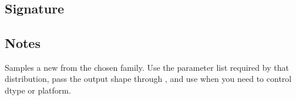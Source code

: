\documentclass[letterpaper,10pt,english]{sphinxmanual}
\begin{document}
\section{}
\label{\detokenize{api_reference:sample}}

\subsection{Signature}
\label{\detokenize{api_reference:id1}}
\begin{sphinxVerbatim}[commandchars=\\\{\}]
\end{sphinxVerbatim}


\subsection{Notes}
\label{\detokenize{api_reference:id2}}
\sphinxAtStartPar
Samples a new  from the chosen family. Use the parameter list required by that distribution, pass the output shape through , and use  when you need to control dtype or platform.
\end{document}
